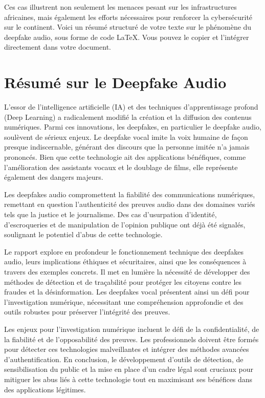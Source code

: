\documentclass[12pt,a4paper]{article}
\begin{document}
Ces cas illustrent non seulement les menaces pesant sur les infrastructures africaines, mais également les efforts nécessaires pour renforcer la cybersécurité sur le continent.
Voici un résumé structuré de votre texte sur le phénomène du deepfake audio, sous forme de code LaTeX. Vous pouvez le copier et l’intégrer directement dans votre document.

\section{Résumé sur le Deepfake Audio}

L'essor de l'intelligence artificielle (IA) et des techniques d'apprentissage profond (Deep Learning) a radicalement modifié la création et la diffusion des contenus numériques. Parmi ces innovations, les deepfakes, en particulier le deepfake audio, soulèvent de sérieux enjeux. Le deepfake vocal imite la voix humaine de façon presque indiscernable, générant des discours que la personne imitée n'a jamais prononcés. Bien que cette technologie ait des applications bénéfiques, comme l'amélioration des assistants vocaux et le doublage de films, elle représente également des dangers majeurs.

Les deepfakes audio compromettent la fiabilité des communications numériques, remettant en question l'authenticité des preuves audio dans des domaines variés tels que la justice et le journalisme. Des cas d'usurpation d'identité, d'escroqueries et de manipulation de l'opinion publique ont déjà été signalés, soulignant le potentiel d'abus de cette technologie.

Le rapport explore en profondeur le fonctionnement technique des deepfakes audio, leurs implications éthiques et sécuritaires, ainsi que les conséquences à travers des exemples concrets. Il met en lumière la nécessité de développer des méthodes de détection et de traçabilité pour protéger les citoyens contre les fraudes et la désinformation. Les deepfakes vocal présentent ainsi un défi pour l'investigation numérique, nécessitant une compréhension approfondie et des outils robustes pour préserver l'intégrité des preuves.

Les enjeux pour l’investigation numérique incluent le défi de la confidentialité, de la fiabilité et de l’opposabilité des preuves. Les professionnels doivent être formés pour détecter ces technologies malveillantes et intégrer des méthodes avancées d'authentification. En conclusion, le développement d’outils de détection, de sensibilisation du public et la mise en place d'un cadre légal sont cruciaux pour mitiguer les abus liés à cette technologie tout en maximisant ses bénéfices dans des applications légitimes.
\end{document}
